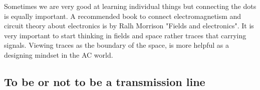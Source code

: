 \documentclass[final]{cubedoc}
\begin{document}
	
	
	
	Sometimes we are very good at learning individual things but connecting the dots is equally important. A recommended book to connect electromagnetism and circuit theory about electronics is by Ralh Morrison "Fields and electronics". It is very important to start thinking in fields and space rather traces that carrying signals. Viewing traces as the boundary of the space, is more helpful as a designing mindset in the AC world.
	
	
	\subsection{To be or not to be a transmission line}
	
\end{document}
